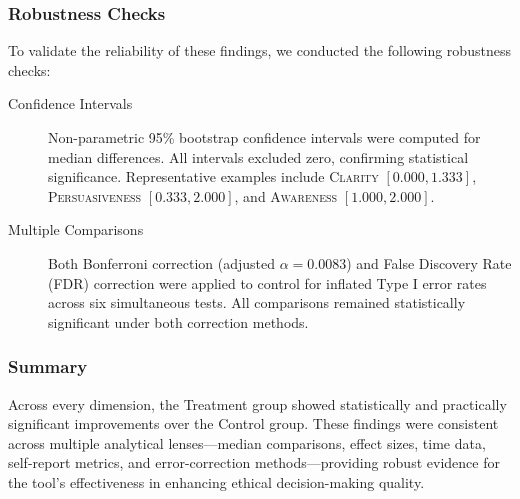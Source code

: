 \subsubsection*{Robustness Checks}

To validate the reliability of these findings, we conducted the following robustness checks:

\begin{description}
  \item[Confidence Intervals] Non-parametric 95\% bootstrap confidence intervals were computed for median differences. All intervals excluded zero, confirming statistical significance. Representative examples include \textsc{Clarity} $[0.000, 1.333]$, \textsc{Persuasiveness} $[0.333, 2.000]$, and \textsc{Awareness} $[1.000, 2.000]$.

  \item[Multiple Comparisons] Both Bonferroni correction (adjusted $\alpha = 0.0083$) and False Discovery Rate (FDR) correction were applied to control for inflated Type I error rates across six simultaneous tests. All comparisons remained statistically significant under both correction methods.
\end{description}

\subsubsection*{Summary}

Across every dimension, the Treatment group showed statistically and practically significant improvements over the Control group. These findings were consistent across multiple analytical lenses—median comparisons, effect sizes, time data, self-report metrics, and error-correction methods—providing robust evidence for the tool's effectiveness in enhancing ethical decision-making quality.
